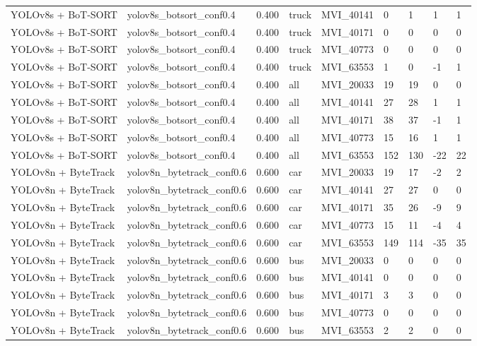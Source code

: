 \begin{tabular}{lllllllll}
YOLOv8s + BoT-SORT & yolov8s\_botsort\_conf0.4 & 0.400 & truck & MVI\_40141 & 0 & 1 & 1 & 1 \\
YOLOv8s + BoT-SORT & yolov8s\_botsort\_conf0.4 & 0.400 & truck & MVI\_40171 & 0 & 0 & 0 & 0 \\
YOLOv8s + BoT-SORT & yolov8s\_botsort\_conf0.4 & 0.400 & truck & MVI\_40773 & 0 & 0 & 0 & 0 \\
YOLOv8s + BoT-SORT & yolov8s\_botsort\_conf0.4 & 0.400 & truck & MVI\_63553 & 1 & 0 & -1 & 1 \\
YOLOv8s + BoT-SORT & yolov8s\_botsort\_conf0.4 & 0.400 & all & MVI\_20033 & 19 & 19 & 0 & 0 \\
YOLOv8s + BoT-SORT & yolov8s\_botsort\_conf0.4 & 0.400 & all & MVI\_40141 & 27 & 28 & 1 & 1 \\
YOLOv8s + BoT-SORT & yolov8s\_botsort\_conf0.4 & 0.400 & all & MVI\_40171 & 38 & 37 & -1 & 1 \\
YOLOv8s + BoT-SORT & yolov8s\_botsort\_conf0.4 & 0.400 & all & MVI\_40773 & 15 & 16 & 1 & 1 \\
YOLOv8s + BoT-SORT & yolov8s\_botsort\_conf0.4 & 0.400 & all & MVI\_63553 & 152 & 130 & -22 & 22 \\
YOLOv8n + ByteTrack & yolov8n\_bytetrack\_conf0.6 & 0.600 & car & MVI\_20033 & 19 & 17 & -2 & 2 \\
YOLOv8n + ByteTrack & yolov8n\_bytetrack\_conf0.6 & 0.600 & car & MVI\_40141 & 27 & 27 & 0 & 0 \\
YOLOv8n + ByteTrack & yolov8n\_bytetrack\_conf0.6 & 0.600 & car & MVI\_40171 & 35 & 26 & -9 & 9 \\
YOLOv8n + ByteTrack & yolov8n\_bytetrack\_conf0.6 & 0.600 & car & MVI\_40773 & 15 & 11 & -4 & 4 \\
YOLOv8n + ByteTrack & yolov8n\_bytetrack\_conf0.6 & 0.600 & car & MVI\_63553 & 149 & 114 & -35 & 35 \\
YOLOv8n + ByteTrack & yolov8n\_bytetrack\_conf0.6 & 0.600 & bus & MVI\_20033 & 0 & 0 & 0 & 0 \\
YOLOv8n + ByteTrack & yolov8n\_bytetrack\_conf0.6 & 0.600 & bus & MVI\_40141 & 0 & 0 & 0 & 0 \\
YOLOv8n + ByteTrack & yolov8n\_bytetrack\_conf0.6 & 0.600 & bus & MVI\_40171 & 3 & 3 & 0 & 0 \\
YOLOv8n + ByteTrack & yolov8n\_bytetrack\_conf0.6 & 0.600 & bus & MVI\_40773 & 0 & 0 & 0 & 0 \\
YOLOv8n + ByteTrack & yolov8n\_bytetrack\_conf0.6 & 0.600 & bus & MVI\_63553 & 2 & 2 & 0 & 0 \\

\end{tabular}

